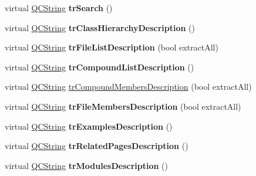 \begin{DoxyCompactItemize}
\item 
\hypertarget{class_translator_swedish_a6a284cb12ea8d274211aa42dad4654c4}{virtual \hyperlink{class_q_c_string}{Q\-C\-String} {\bfseries tr\-Search} ()}\label{class_translator_swedish_a6a284cb12ea8d274211aa42dad4654c4}

\item 
\hypertarget{class_translator_swedish_a7697957dd30cb62ae6635bdd99b828b3}{virtual \hyperlink{class_q_c_string}{Q\-C\-String} {\bfseries tr\-Class\-Hierarchy\-Description} ()}\label{class_translator_swedish_a7697957dd30cb62ae6635bdd99b828b3}

\item 
\hypertarget{class_translator_swedish_adca38ddeb72745fe24c61ff08af9e6c4}{virtual \hyperlink{class_q_c_string}{Q\-C\-String} {\bfseries tr\-File\-List\-Description} (bool extract\-All)}\label{class_translator_swedish_adca38ddeb72745fe24c61ff08af9e6c4}

\item 
\hypertarget{class_translator_swedish_af008bc8cb43ee14946b1671d80099a34}{virtual \hyperlink{class_q_c_string}{Q\-C\-String} {\bfseries tr\-Compound\-List\-Description} ()}\label{class_translator_swedish_af008bc8cb43ee14946b1671d80099a34}

\item 
virtual \hyperlink{class_q_c_string}{Q\-C\-String} \hyperlink{class_translator_swedish_ab5fb09f47fa021d41e036d9f41bf741a}{tr\-Compound\-Members\-Description} (bool extract\-All)
\item 
\hypertarget{class_translator_swedish_a209311e74b83f8ac8eba8581d8a89eb9}{virtual \hyperlink{class_q_c_string}{Q\-C\-String} {\bfseries tr\-File\-Members\-Description} (bool extract\-All)}\label{class_translator_swedish_a209311e74b83f8ac8eba8581d8a89eb9}

\item 
\hypertarget{class_translator_swedish_a0085d1262f19b68fdad2ad542f24914e}{virtual \hyperlink{class_q_c_string}{Q\-C\-String} {\bfseries tr\-Examples\-Description} ()}\label{class_translator_swedish_a0085d1262f19b68fdad2ad542f24914e}

\item 
\hypertarget{class_translator_swedish_a9343c5fac5dbcf77ba7c31a80cb74846}{virtual \hyperlink{class_q_c_string}{Q\-C\-String} {\bfseries tr\-Related\-Pages\-Description} ()}\label{class_translator_swedish_a9343c5fac5dbcf77ba7c31a80cb74846}

\item 
\hypertarget{class_translator_swedish_aafdd368977a57dc31d200e624a1358ac}{virtual \hyperlink{class_q_c_string}{Q\-C\-String} {\bfseries tr\-Modules\-Description} ()}\label{class_translator_swedish_aafdd368977a57dc31d200e624a1358ac}


\end{DoxyCompactItemize}
